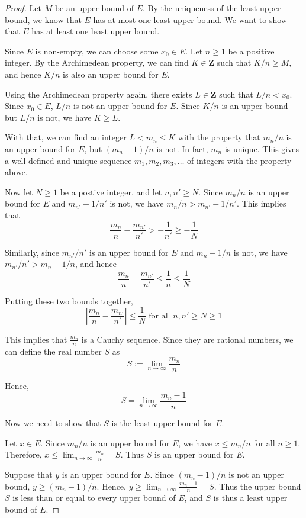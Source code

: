 \documentclass[12pt,a4paper]{article}
\theoremstyle{definition}
\begin{document}
\begin{proof}
  Let $M$ be an upper bound of $E$. By the uniqueness of the least upper bound, we know that $E$ has at most one least upper bound. We want to show that $E$ has at least one least upper bound.

  Since $E$ is non-empty, we can choose some $x_0 \in E$. Let $n \geq 1$ be a positive integer. By the Archimedean property, we can find $K \in \textbf{Z}$ such that $K/n \geq M$, and hence $K/n$ is also an upper bound for $E$.
  
  Using the Archimedean property again, there exists $L \in \textbf{Z}$ such that $L/n < x_0$. Since $x_0 \in E$, $L/n$ is not an upper bound for $E$. Since $K/n$ is an upper bound but $L/n$ is not, we have $K \geq L$. 

  With that, we can find an integer $L < m_n \leq K$ with the property that $m_n / n$ is an upper bound for $E$, but $(m_n-1)/n$ is not. In fact, $m_n$ is unique. This gives a well-defined and unique sequence $m_1, m_2, m_3, \ldots$ of integers with the property above. 

  Now let $N \geq 1$ be a postive integer, and let $n, n' \geq N$. Since $m_n/n$ is an upper bound for $E$ and $m_{n'}-1/n'$ is not, we have $m_n/n > m_{n'}-1/n'$. This implies that 
  \[
    \frac{m_n}{n} - \frac{m_{n'}}{n'} > - \frac{1}{n'} \geq - \frac{1}{N}
  \]

  Similarly, since $m_{n'}/n'$ is an upper bound for $E$ and $m_{n}-1/n$ is not, we have $m_{n'}/n' > m_{n}-1/n$, and hence
  \[
    \frac{m_n}{n} - \frac{m_{n'}}{n'} \leq \frac{1}{n} \leq \frac{1}{N}
  \]

  Putting these two bounds together,
  \[
    \left| \frac{m_n}{n} - \frac{m_{n'}}{n'} \right | \leq \frac{1}{N} \text{ for all } n,n' \geq N \geq 1
  \]

  This implies that $\frac{m_n}{n}$ is a Cauchy sequence. Since they are rational numbers, we can define the real number $S$ as
  \[
    S := \lim_{n \to \infty} \frac{m_n}{n}
  \]

  Hence,
  \[
    S = \lim_{n \to \infty} \frac{m_n - 1}{n}
  \]

  Now we need to show that $S$ is the least upper bound for $E$.

  Let $x \in E$. Since $m_n/n$ is an upper bound for $E$, we have $x \leq m_n/n$ for all $n \geq 1$. Therefore, $x \leq \lim_{n \to \infty} \frac{m_n}{n} = S$. Thus $S$ is an upper bound for $E$.

  Suppose that $y$ is an upper bound for $E$. Since $(m_n - 1)/n$ is not an upper bound, $y \geq (m_n - 1)/n$. Hence, $y \geq \lim_{n \to \infty} \frac{m_n - 1}{n} = S$. Thus the upper bound $S$ is less than or equal to every upper bound of $E$, and $S$ is thus a least upper bound of $E$. 
\end{proof}
\end{document}
